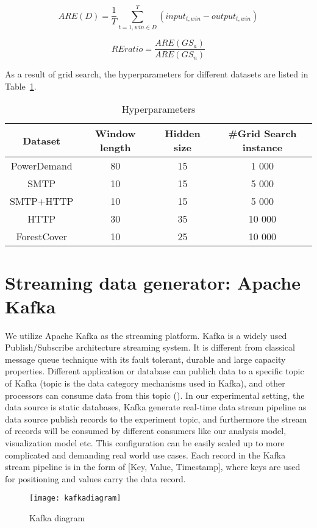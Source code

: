 \begin{equation}\label{eq:are}
ARE(D) = \frac{1}{T}\sum_{t=1,win\in D}^{T}(input_{t,win}-output_{t,win})
\end{equation}

\begin{equation}\label{eq:ratio}
REratio=\frac{ARE(GS_a)}{ARE(GS_n)}
\end{equation}


As a result of grid search, the hyperparameters for different datasets are listed in Table~\ref{tab:hyper}.

\begin{table}[h] 
\caption{Hyperparameters} 
\centering      
\begin{tabular}{c c c c}  
\hline\hline        
Dataset & Window length & Hidden size & \#Grid Search instance \\ [0.5ex] 
\hline 
PowerDemand & 80 & 15 & 1 000 \\  
SMTP & 10 & 15 &  5 000 \\ 
SMTP+HTTP & 10 & 15 & 5 000 \\ 
HTTP & 30 & 35  &  10 000 \\ 
ForestCover & 10 & 25 & 10 000 \\ [1ex]  
\hline    
\end{tabular}
\label{tab:hyper}  
\end{table} 


\section{Streaming data generator: Apache Kafka}
\label{sec:Streaming data generator: Apache Kafka}

We utilize Apache Kafka as the streaming platform. Kafka is a widely used Publish/Subscribe architecture streaming system. It is different from classical message queue technique with its fault tolerant, durable and large capacity properties. Different application or database can publich data to a specific topic of Kafka (topic is the data category mechanisms used in Kafka), and other processors can consume data from this topic (). In our experimental setting, the data source is static databases, Kafka generate real-time data stream pipeline as data source publish records to the experiment topic, and furthermore the stream of records will be consumed by different consumers like our analysis model, visualization model etc. This configuration can be easily scaled up to more complicated and demanding real world use cases. Each record in the Kafka stream pipeline is in the form of [Key, Value, Timestamp], where keys are used for positioning and values carry the data record.

\begin{figure}[h]
\centering
\texttt{[image: kafkadiagram]}
\caption[Kafka diagram]{Kafka diagram\footnotemark}
\label{fig:kafkadiagram}
\end{figure}









